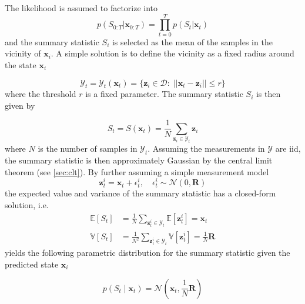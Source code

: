 The likelihood is assumed to factorize into
\begin{equation}
    p(S_{0:T} | \boldsymbol{x}_{0:T}) = \prod_{t=0}^{T} p(S_t | \boldsymbol{x}_t)
\end{equation} and the summary statistic $S_i$ is selected as the mean of the samples in the vicinity of $\boldsymbol{x}_i$. A simple solution is to define the vicinity as a fixed radius around the state $\boldsymbol{x}_i$

\begin{equation}
    \mathcal{Y}_t = \mathcal{Y}_t(\boldsymbol{x}_t) = \{\boldsymbol{z}_i \in \mathcal{D} : \; ||\boldsymbol{x}_t - \boldsymbol{z}_i|| \leq r\}
\end{equation}
where the threshold $r$ is a fixed parameter. The summary statistic $S_i$ is then given by

\begin{equation}
    S_t = S(\boldsymbol{x}_t) = \frac{1}{N} \sum_{\boldsymbol{z}_i \in \mathcal{Y}_t} \boldsymbol{z}_i
\end{equation}
where $N$ is the number of samples in $\mathcal{Y}_t$. Assuming the measurements in $\mathcal{Y}$ are \acrshort{iid}, the summary statistic is then approximately Gaussian by the central limit theorem (see \cref{sec:clt}). By further assuming a simple measurement model
\begin{equation}\label{eq:gp_ekf_sl_z}
    \boldsymbol{z}_t^{i} = \boldsymbol{x}_t + \epsilon^i_t, \quad \epsilon_t^i \sim \mathcal{N}(0, \boldsymbol{R})
\end{equation}
the expected value and variance of the summary statistic has a closed-form solution, i.e.
\begin{subequations}
\begin{align}
    \mathbb{E}[S_t] &= \frac{1}{N} \sum_{\boldsymbol{z}_t^i \in \mathcal{Y}_t} \mathbb{E}[\boldsymbol{z}_t^i] = \boldsymbol{x}_t\\
    \mathbb{V}[S_t] &= \frac{1}{N^2} \sum_{\boldsymbol{z}_t^i \in \mathcal{Y}_t} \mathbb{V}[\boldsymbol{z}_t^i] = \frac{1}{N} \boldsymbol{R}
\end{align}
\end{subequations}
yields the following parametric distribution for the summary statistic given the predicted state $\boldsymbol{x}_i$

\begin{equation}
    p(S_t \;| \; \boldsymbol{x}_t) = \mathcal{N}(\boldsymbol{x}_t, \frac{1}{N} \boldsymbol{R})
\end{equation}


